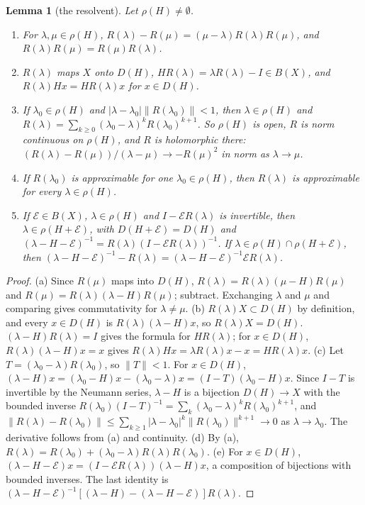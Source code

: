 \documentclass[11pt]{article}
\newtheorem{lemma}{Lemma}[section]
\theoremstyle{definition}
\begin{document}
\begin{lemma}[the resolvent]\label{lem:A-res}
Let $\rho(H) \ne \emptyset$.
\begin{enumerate}
\item[(a)] For $\lambda, \mu \in \rho(H)$, $R(\lambda) - R(\mu) = (\mu - \lambda)R(\lambda)R(\mu)$, and $R(\lambda)R(\mu) = R(\mu)R(\lambda)$.
\item[(b)] $R(\lambda)$ maps $X$ onto $D(H)$, $HR(\lambda) = \lambda R(\lambda) - I \in B(X)$, and $R(\lambda)Hx = HR(\lambda)x$ for $x \in D(H)$.
\item[(c)] If $\lambda_0 \in \rho(H)$ and $|\lambda - \lambda_0|\|R(\lambda_0)\| < 1$, then $\lambda \in \rho(H)$ and $R(\lambda) = \sum_{k\ge0}(\lambda_0 - \lambda)^kR(\lambda_0)^{k+1}$. So $\rho(H)$ is open, $R$ is norm continuous on $\rho(H)$, and $R$ is holomorphic there: $(R(\lambda) - R(\mu))/(\lambda - \mu) \to -R(\mu)^2$ in norm as $\lambda \to \mu$.
\item[(d)] If $R(\lambda_0)$ is approximable for one $\lambda_0 \in \rho(H)$, then $R(\lambda)$ is approximable for every $\lambda \in \rho(H)$.
\item[(e)] If $\mathcal E \in B(X)$, $\lambda \in \rho(H)$ and $I - \mathcal ER(\lambda)$ is invertible, then $\lambda \in \rho(H + \mathcal E)$, with $D(H + \mathcal E) = D(H)$ and $(\lambda - H - \mathcal E)^{-1} = R(\lambda)(I - \mathcal ER(\lambda))^{-1}$. If $\lambda \in \rho(H) \cap \rho(H + \mathcal E)$, then $(\lambda - H - \mathcal E)^{-1} - R(\lambda) = (\lambda - H - \mathcal E)^{-1}\mathcal ER(\lambda)$.
\end{enumerate}
\end{lemma}

\begin{proof}
(a) Since $R(\mu)$ maps into $D(H)$, $R(\lambda) = R(\lambda)(\mu - H)R(\mu)$ and $R(\mu) = R(\lambda)(\lambda - H)R(\mu)$; subtract. Exchanging $\lambda$ and $\mu$ and comparing gives commutativity for $\lambda \ne \mu$. (b) $R(\lambda)X \subset D(H)$ by definition, and every $x \in D(H)$ is $R(\lambda)(\lambda - H)x$, so $R(\lambda)X = D(H)$. $(\lambda - H)R(\lambda) = I$ gives the formula for $HR(\lambda)$; for $x \in D(H)$, $R(\lambda)(\lambda - H)x = x$ gives $R(\lambda)Hx = \lambda R(\lambda)x - x = HR(\lambda)x$. (c) Let $T = (\lambda_0 - \lambda)R(\lambda_0)$, so $\|T\| < 1$. For $x \in D(H)$, $(\lambda - H)x = (\lambda_0 - H)x - (\lambda_0 - \lambda)x = (I - T)(\lambda_0 - H)x$. Since $I - T$ is invertible by the Neumann series, $\lambda - H$ is a bijection $D(H) \to X$ with the bounded inverse $R(\lambda_0)(I - T)^{-1} = \sum_k(\lambda_0 - \lambda)^kR(\lambda_0)^{k+1}$, and $\|R(\lambda) - R(\lambda_0)\| \le \sum_{k\ge1}|\lambda - \lambda_0|^k\|R(\lambda_0)\|^{k+1} \to 0$ as $\lambda \to \lambda_0$. The derivative follows from (a) and continuity. (d) By (a), $R(\lambda) = R(\lambda_0) + (\lambda_0 - \lambda)R(\lambda)R(\lambda_0)$. (e) For $x \in D(H)$, $(\lambda - H - \mathcal E)x = (I - \mathcal ER(\lambda))(\lambda - H)x$, a composition of bijections with bounded inverses. The last identity is $(\lambda - H - \mathcal E)^{-1}[(\lambda - H) - (\lambda - H - \mathcal E)]R(\lambda)$.
\end{proof}
\end{document}
